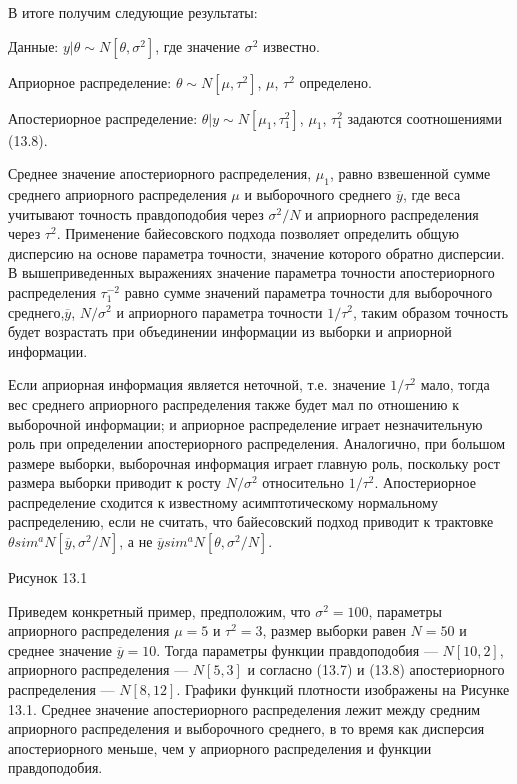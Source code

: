 В итоге получим следующие результаты:

Данные: $y|\theta{\sim}N[\theta,\sigma^{2}]$, где значение $\sigma^{2}$ известно.

Априорное распределение: $\theta{\sim}N[\mu,\tau^2]$, $\mu$, $\tau^2$ определено.

Апостериорное распределение: $\theta|y{\sim}N[\mu_1,\tau^{2}_{1}]$, $\mu_1$, $\tau^{2}_1$ задаются соотношениями (13.8).

Среднее значение апостериорного распределения, $\mu_1$, равно взвешенной сумме среднего априорного распределения $\mu$ и выборочного среднего $\overline{y}$, где веса учитывают точность правдоподобия через $\sigma^{2}/N$ и априорного распределения через $\tau^{2}$. Применение байесовского подхода позволяет определить общую дисперсию на основе  параметра точности, значение которого обратно дисперсии. В вышеприведенных выражениях значение параметра точности апостериорного распределения $\tau^{-2}_1$ равно сумме значений параметра точности для выборочного среднего,$\overline{y}$, $N/\sigma^{2}$ и априорного параметра точности $1/\tau^{2}$, таким образом точность будет возрастать при объединении информации из выборки и априорной информации. 

Если априорная информация является неточной, т.е. значение $1/\tau^{2}$ мало, тогда вес среднего априорного распределения также будет мал по отношению к выборочной информации; и априорное распределение играет незначительную роль при определении апостериорного распределения. Аналогично, при большом размере выборки, выборочная информация играет главную роль, поскольку рост размера выборки приводит к росту $N/\sigma^{2}$ относительно $1/\tau^{2}$. Апостериорное распределение сходится к известному асимптотическому нормальному распределению, если не считать, что байесовский подход приводит к трактовке $\theta{sim^{a}N[\overline{y},\sigma^{2}/N]}$, а не $\overline{y}{sim}^{a}N[\theta,\sigma^{2}/N]$.


Рисунок 13.1


Приведем конкретный пример, предположим, что $\sigma^{2}=100$, параметры априорного распределения $\mu=5$ и $\tau^{2}=3$, размер выборки равен $N=50$ и среднее значение $\overline{y}=10$. Тогда параметры функции правдоподобия --- $N[10,2]$, априорного распределения --- $N[5,3]$ и согласно (13.7) и (13.8) апостериорного распределения --- $N[8,12]$. Графики функций плотности изображены на Рисунке 13.1. Среднее значение апостериорного распределения лежит между средним априорного распределения и выборочного среднего, в то время как дисперсия апостериорного  меньше, чем у априорного распределения и функции правдоподобия. 


